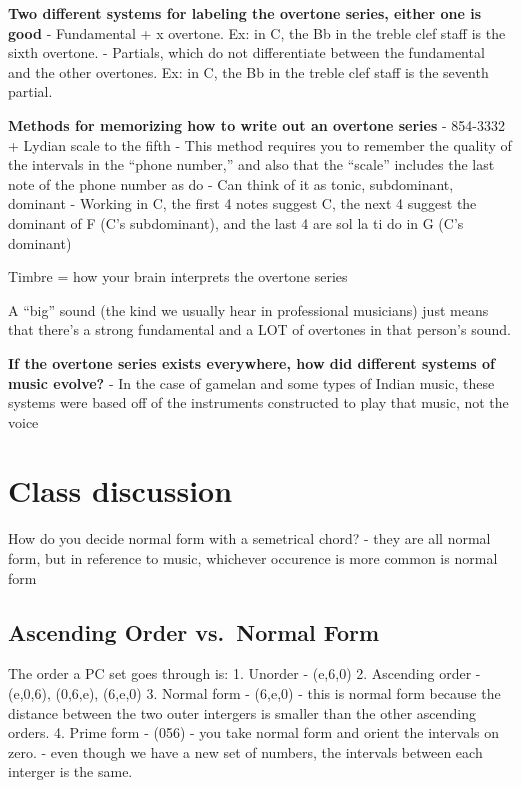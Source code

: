 \documentclass{book}
\begin{document}
\textbf{Two different systems for labeling the overtone series, either one is
good} - Fundamental + x overtone. Ex: in C, the Bb in the treble clef staff is
the sixth overtone. - Partials, which do not differentiate between the
fundamental and the other overtones. Ex: in C, the Bb in the treble clef staff
is the seventh partial.

\textbf{Methods for memorizing how to write out an overtone series} - 854-3332
+ Lydian scale to the fifth - This method requires you to remember the quality
of the intervals in the ``phone number,'' and also that the ``scale'' includes
the last note of the phone number as do - Can think of it as tonic,
subdominant, dominant - Working in C, the first 4 notes suggest C, the next 4
suggest the dominant of F (C's subdominant), and the last 4 are sol la ti do
in G (C's dominant)

Timbre = how your brain interprets the overtone series

A ``big'' sound (the kind we usually hear in professional musicians) just
means that there's a strong fundamental and a LOT of overtones in that
person's sound.

\textbf{If the overtone series exists everywhere, how did different systems of
music evolve?} - In the case of gamelan and some types of Indian music, these
systems were based off of the instruments constructed to play that music, not
the voice

\hypertarget{class-discussion-62}{%
\chapter{Class discussion}\label{class-discussion-62}}

How do you decide normal form with a semetrical chord? - they are all normal
form, but in reference to music, whichever occurence is more common is normal
form

\hypertarget{ascending-order-vs.-normal-form}{%
\section{Ascending Order vs.~Normal
Form}\label{ascending-order-vs.-normal-form}}

The order a PC set goes through is: 1. Unorder - (e,6,0) 2. Ascending order -
(e,0,6), (0,6,e), (6,e,0) 3. Normal form - (6,e,0) - this is normal form
because the distance between the two outer intergers is smaller than the other
ascending orders. 4. Prime form - (056) - you take normal form and orient the
intervals on zero. - even though we have a new set of numbers, the intervals
between each interger is the same.
\end{document}
